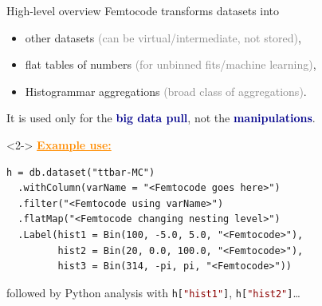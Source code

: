 \documentclass{beamer}
\begin{document}
\begin{frame}[fragile]{High-level overview}
\vspace{0.5 cm}
Femtocode transforms datasets into
\begin{itemize}
\item other datasets \textcolor{gray}{(can be virtual/intermediate, not stored)},
\item flat tables of numbers \textcolor{gray}{(for unbinned fits/machine learning)},
\item Histogrammar aggregations \textcolor{gray}{(broad class of aggregations)}.
\end{itemize}

It is used only for the \textcolor{darkblue}{\bf big data pull}, not the \textcolor{darkblue}{\bf manipulations}.

\vspace{0.5 cm}
\begin{uncoverenv}<2->
\textcolor{darkorange}{\bf \underline{Example use:}}

\small
\begin{verbatim}
h = db.dataset("ttbar-MC")
  .withColumn(varName = "<Femtocode goes here>")
  .filter("<Femtocode using varName>")
  .flatMap("<Femtocode changing nesting level>")
  .Label(hist1 = Bin(100, -5.0, 5.0, "<Femtocode>"),
         hist2 = Bin(20, 0.0, 100.0, "<Femtocode>"),
         hist3 = Bin(314, -pi, pi, "<Femtocode>"))
\end{verbatim}

\normalsize
followed by Python analysis with {\small\tt h[\textcolor{darkred}{"hist1"}]}, {\small\tt h[\textcolor{darkred}{"hist2"}]}\ldots
\end{uncoverenv}
\end{frame}
\end{document}
